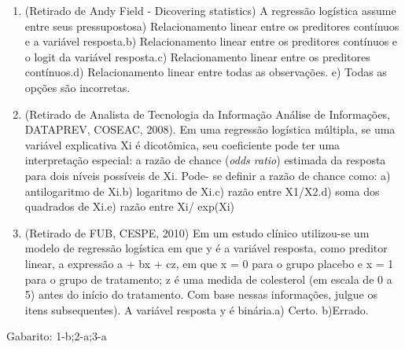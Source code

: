 \documentclass[
]{book}
\newenvironment{question}{
  \definecolor{shadecolor}{rgb}{0, 0, 0}  %
  \color{white}
  \begin{shaded}}
 {\end{shaded}}
\begin{document}
\begin{question}

\begin{enumerate}
\def\labelenumi{\arabic{enumi}.}
\item
  (Retirado de Andy Field - Dicovering statistics) A regressão logística assume entre seus pressupostosa) Relacionamento linear entre os preditores contínuos e a variável resposta.b) Relacionamento linear entre os preditores contínuos e o logit da variável resposta.c) Relacionamento linear entre os preditores contínuos.d) Relacionamento linear entre todas as observações. e) Todas as opções são incorretas.
\item
  (Retirado de Analista de Tecnologia da Informação Análise de Informações, DATAPREV, COSEAC, 2008). Em uma regressão logística múltipla, se uma variável explicativa Xi é dicotômica, seu coeficiente pode ter uma interpretação especial: a razão de chance (\emph{odds ratio}) estimada da resposta para dois níveis possíveis de Xi. Pode- se definir a razão de chance como: a) antilogaritmo de Xi.b) logaritmo de Xi.c) razão entre X1/X2.d) soma dos quadrados de Xi.e) razão entre Xi/ exp(Xi)
\item
  (Retirado de FUB, CESPE, 2010) Em um estudo clínico utilizou-se um modelo de regressão logística em que y é a variável resposta, como preditor linear, a expressão a + bx + cz, em que x = 0 para o grupo placebo e x = 1 para o grupo de tratamento; z é uma medida de colesterol (em escala de 0 a 5) antes do início do tratamento. Com base nessas informações, julgue os itens subsequentes). A variável resposta y é binária.a) Certo.
  b)Errado.
\end{enumerate}

\end{question}

Gabarito: 1-b;2-a;3-a

  
\end{document}
